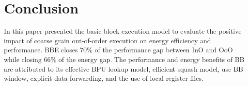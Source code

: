 \section{Conclusion}
\label{sec:conclusion}

In this paper presented the basic-block execution model to evaluate the positive
impact of coarse grain out-of-order execution on energy efficiency and
performance. BBE closes 70\% of the performance gap between InO and OoO while
closing 66\% of the energy gap. The performance and energy benefits of BB are
attributed to its effective BPU lookup model, efficient squash model, use BB
window, explicit data forwarding, and the use of local register files.
